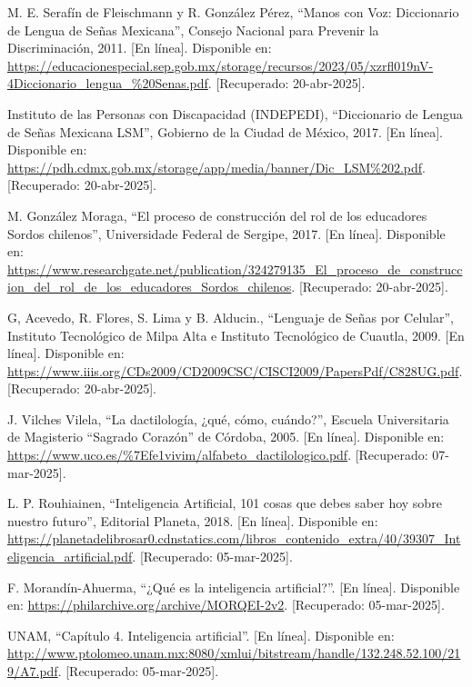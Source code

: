 \begin{thebibliography}{99}
    M. E. Serafín de Fleischmann y R. González Pérez, “Manos con Voz: Diccionario de Lengua de Señas Mexicana”, Consejo Nacional para Prevenir la Discriminación, 2011. [En línea]. Disponible en: \url{https://educacionespecial.sep.gob.mx/storage/recursos/2023/05/xzrfl019nV-4Diccionario_lengua_%20Senas.pdf}. [Recuperado: 20-abr-2025].

    Instituto de las Personas con Discapacidad (INDEPEDI), “Diccionario de Lengua de Señas Mexicana LSM”, Gobierno de la Ciudad de México, 2017. [En línea]. Disponible en: \url{https://pdh.cdmx.gob.mx/storage/app/media/banner/Dic_LSM%202.pdf}. [Recuperado: 20-abr-2025].

    M. González Moraga, “El proceso de construcción del rol de los educadores Sordos chilenos”, Universidade Federal de Sergipe, 2017. [En línea]. Disponible en: \url{https://www.researchgate.net/publication/324279135_El_proceso_de_construccion_del_rol_de_los_educadores_Sordos_chilenos}. [Recuperado: 20-abr-2025].

    G, Acevedo, R. Flores, S. Lima y B. Alducin., “Lenguaje de Señas por Celular”, Instituto Tecnológico de Milpa Alta e Instituto Tecnológico de Cuautla, 2009. [En línea]. Disponible en: \url{https://www.iiis.org/CDs2009/CD2009CSC/CISCI2009/PapersPdf/C828UG.pdf}. [Recuperado: 20-abr-2025].

    J. Vilches Vilela, “La dactilología, ¿qué, cómo, cuándo?”, Escuela Universitaria de Magisterio “Sagrado Corazón” de Córdoba, 2005. [En línea]. Disponible en: \url{https://www.uco.es/%7Efe1vivim/alfabeto_dactilologico.pdf}. [Recuperado: 07-mar-2025].

    L. P. Rouhiainen, “Inteligencia Artificial, 101 cosas que debes saber hoy sobre nuestro futuro”, Editorial Planeta, 2018. [En línea]. Disponible en: \url{https://planetadelibrosar0.cdnstatics.com/libros_contenido_extra/40/39307_Inteligencia_artificial.pdf}. [Recuperado: 05-mar-2025].

    F. Morandín-Ahuerma, “¿Qué es la inteligencia artificial?”. [En línea]. Disponible en: \url{https://philarchive.org/archive/MORQEI-2v2}. [Recuperado: 05-mar-2025].

    UNAM, “Capítulo 4. Inteligencia artificial”. [En línea]. Disponible en: \url{http://www.ptolomeo.unam.mx:8080/xmlui/bitstream/handle/132.248.52.100/219/A7.pdf}. [Recuperado: 05-mar-2025].


\end{thebibliography}
